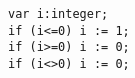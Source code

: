 \documentclass{article}
\begin{document}
\begin{lstlisting}
var i:integer;
if (i<=0) i := 1;
if (i>=0) i := 0;
if (i<>0) i := 0;
\end{lstlisting}
\end{document}
